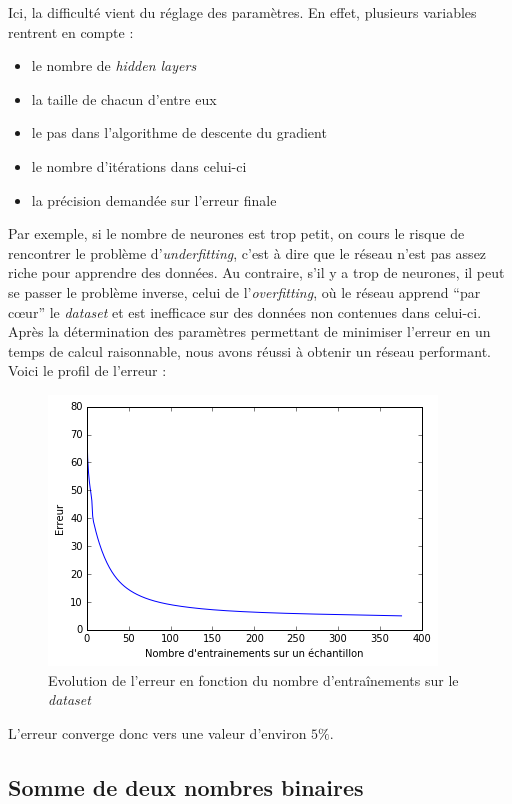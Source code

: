 \documentclass[a4paper,10pt]{article}
\begin{document}
Ici, la difficulté vient du réglage des paramètres. En effet, plusieurs variables rentrent en compte :
\begin{itemize}
 \item le nombre de \textit{hidden layers}
 \item la taille de chacun d'entre eux
 \item le pas dans l'algorithme de descente du gradient
 \item le nombre d'itérations dans celui-ci
 \item la précision demandée sur l'erreur finale
\end{itemize}

Par exemple, si le nombre de neurones est trop petit, on cours le risque de rencontrer le problème d'\textit{underfitting}, c'est à dire
que le réseau n'est pas assez riche pour apprendre des données. Au contraire, s'il y a trop de neurones, il peut 
se passer le problème inverse, celui de l'\textit{overfitting}, où le réseau apprend ``par cœur'' le \textit{dataset} et est inefficace 
sur des données non contenues dans celui-ci. \\
Après la détermination des paramètres permettant de minimiser l'erreur en un temps de calcul raisonnable, nous avons réussi à obtenir un 
réseau performant. Voici le profil de l'erreur :

\begin{figure}[H]
\centering
\captionsetup{justification=centering,margin=2cm}
\includegraphics[scale = 0.6]{erreur_iris}
\caption{Evolution de l'erreur en fonction du nombre d'entraînements sur le \textit{dataset}}
 
\end{figure}

L'erreur converge donc vers une valeur d'environ $5 \% $.

\subsection{Somme de deux nombres binaires}
\end{document}
